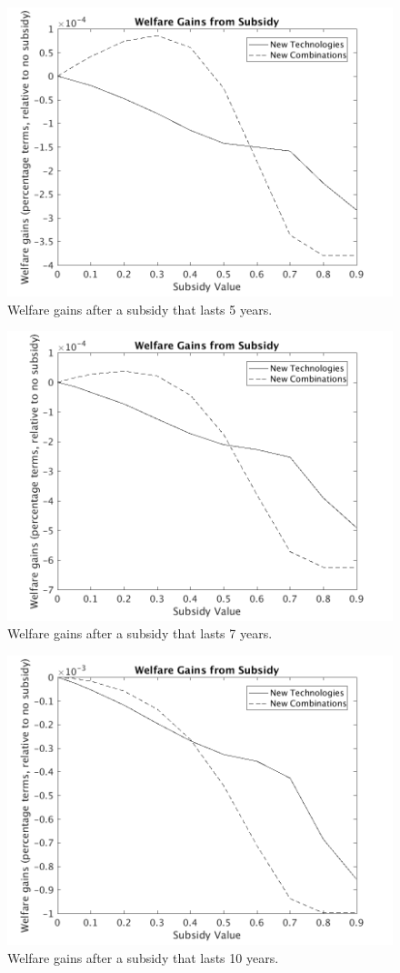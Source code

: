 \documentclass[serif]{article}
\theoremstyle{definition}
\begin{document}
\clearpage

\begin{figure}[h!]
\centering
\includegraphics[width=.7\textwidth]{figures/5_years/welfare_gains.png}
\caption{Welfare gains after a subsidy that lasts 5 years.}
\end{figure}

\begin{figure}[h!]
\centering
\includegraphics[width=.7\textwidth]{figures/7_years/welfare_gains.png}
\caption{Welfare gains after a subsidy that lasts 7 years.}
\end{figure}

\clearpage

\begin{figure}[h!]
\centering
\includegraphics[width=.7\textwidth]{figures/10_years/welfare_gains.png}
\caption{Welfare gains after a subsidy that lasts 10 years.}
\end{figure}
\end{document}
